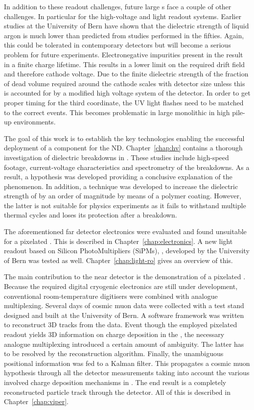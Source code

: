 In addition to these readout challenges, future large \lartpc{}s face a couple of other challenges.
In particular for the high-voltage and light readout systems.
Earlier studies at the University of Bern have shown that the dielectric strength of liquid argon is much lower than predicted from studies performed in the fifties.
Again, this could be tolerated in contemporary detectors but will become a serious problem for future experiments.
Electronegative impurities present in the \lar{} result in a finite charge lifetime.
This results in a lower limit on the required drift field and therefore cathode voltage.
Due to the finite dielectric strength of \lar{} the fraction of dead volume required around the cathode scales with detector size unless this is accounted for by a modified high voltage system of the detector.
In order to get proper timing for the third coordinate, the UV light flashes need to be matched to the correct events.
This becomes problematic in large monolithic \lartpc{} in high pile-up environments.

The goal of this work is to establish the key technologies enabling the successful deployment of a \lartpc{} component for the \dune{} ND.
Chapter~\ref{chap:hv} contains a thorough investigation of dielectric breakdowns in \lar{}.
These studies include high-speed footage, current-voltage characteristics and spectrometry of the breakdowns.
As a result, a hypothesis was developed providing a conclusive explanation of the phenomenon.
In addition, a technique was developed to increase the dielectric strength of \lar{} by an order of magnitude by means of a polymer coating.
However, the latter is not suitable for physics experiments as it fails to withstand multiple thermal cycles and loses its protection after a breakdown.

The aforementioned far detector electronics were evaluated and found unsuitable for a pixelated \lartpc{}.
This is described in Chapter~\ref{chap:electronics}.
A new light readout based on Silicon PhotoMultipliers (SiPMs), \AL{}, developed by the University of Bern was tested as well.
Chapter~\ref{chap:light-ro} gives an overview of this.

The main contribution to the \dune{} near detector is the demonstration of a pixelated \lartpc{}.
Because the required digital cryogenic electronics are still under development, conventional room-temperature digitisers were combined with analogue multiplexing.
Several days of cosmic muon data were collected with a test stand designed and built at the University of Bern.
A software framework was written to reconstruct 3D tracks from the data.
Event though the employed pixelated readout yields 3D information on charge deposition in the \lartpc{}, the necessary analogue multiplexing introduced a certain amount of ambiguity.
The latter has to be resolved by the reconstruction algorithm.
Finally, the unambiguous positional information was fed to a Kalman filter.
This propagates a cosmic muon hypothesis through all the detector measurements taking into account the various involved charge deposition mechanisms in \lar{}.
The end result is a completely reconstructed particle track through the detector.
All of this is described in Chapter~\ref{chap:viper}.

